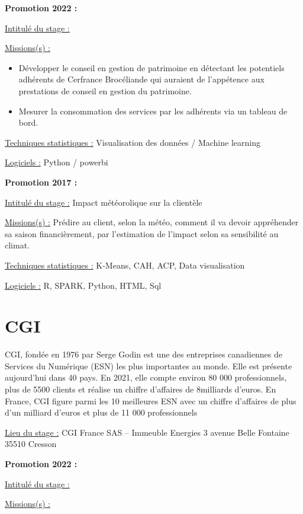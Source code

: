 \documentclass[
  letterpaper,
  DIV=11,
  numbers=noendperiod]{scrreprt}
\begin{document}
\textbf{Promotion 2022 :}

\uline{Intitulé du stage :}

\uline{Missions(s) :}

\begin{itemize}
\item
  Développer le conseil en gestion de patrimoine en détectant les
  potentiels adhérents de Cerfrance Brocéliande qui auraient de
  l'appétence aux prestations de conseil en gestion du patrimoine.
\item
  Mesurer la consommation des services par les adhérents via un tableau
  de bord.
\end{itemize}

\uline{Techniques statistiques :} Visualisation des données / Machine
learning

\uline{Logiciels :} Python / powerbi

\textbf{Promotion 2017 :}

\uline{Intitulé du stage :} Impact météorolique sur la clientèle

\uline{Missions(s) :} Prédire au client, selon la météo, comment il va
devoir appréhender sa saison financièrement, par l'estimation de
l'impact selon sa sensibilité au climat.

\uline{Techniques statistiques :} K-Means, CAH, ACP, Data visualisation

\uline{Logiciels :} R, SPARK, Python, HTML, Sql

\hypertarget{cgi}{%
\section{\texorpdfstring{\textbf{CGI}}{CGI}}\label{cgi}}

CGI, fondée en 1976 par Serge Godin est une des entreprises canadiennes
de Services du Numérique (ESN) les plus importantes au monde. Elle est
présente aujourd'hui dans 40 pays. En 2021, elle compte environ 80 000
professionnels, plus de 5500 clients et réalise un chiffre d'affaires de
8milliards d'euros. En France, CGI figure parmi les 10 meilleures ESN
avec un chiffre d'affaires de plus d'un milliard d'euros et plus de 11
000 professionnels

\uline{Lieu du stage :} CGI France SAS -- Immeuble Energies 3 avenue
Belle Fontaine 35510 Cresson

\textbf{Promotion 2022 :}

\uline{Intitulé du stage :}

\uline{Missions(s) :}
\end{document}

